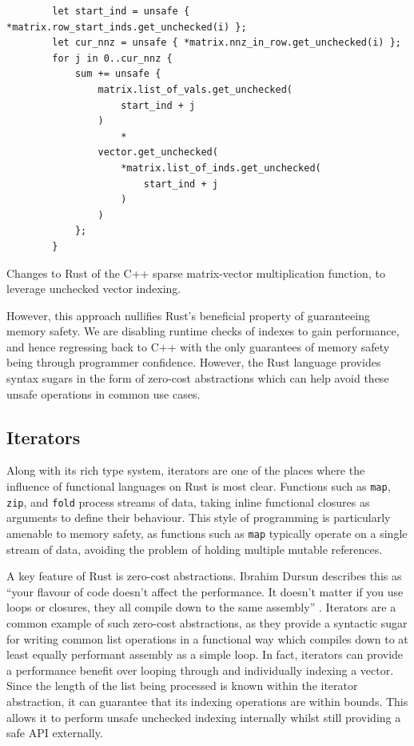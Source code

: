 \begin{listing}[H]
    \begin{verbatim}
        let start_ind = unsafe { *matrix.row_start_inds.get_unchecked(i) };
        let cur_nnz = unsafe { *matrix.nnz_in_row.get_unchecked(i) };
        for j in 0..cur_nnz {
            sum += unsafe {
                matrix.list_of_vals.get_unchecked(
                    start_ind + j
                )
                    *
                vector.get_unchecked(
                    *matrix.list_of_inds.get_unchecked(
                        start_ind + j
                    )
                )
            };
        }
    \end{verbatim}
    \caption{Changes to Rust of the C++ sparse matrix-vector multiplication function, to leverage unchecked vector indexing.}
    \label{listing:rust-sparsemv-unchecked}
\end{listing}

However, this approach nullifies Rust's beneficial property of guaranteeing memory safety. We are disabling runtime checks of indexes to gain performance, and hence regressing back to C++ with the only guarantees of memory safety being through programmer confidence. However, the Rust language provides syntax sugars in the form of zero-cost abstractions which can help avoid these unsafe operations in common use cases.

\subsection{Iterators}
\label{sec:translation-iterators}

Along with its rich type system, iterators are one of the places where the influence of functional languages on Rust is most clear. Functions such as \texttt{map}, \texttt{zip}, and \texttt{fold} process streams of data, taking inline functional closures as arguments to define their behaviour. This style of programming is particularly amenable to memory safety, as functions such as \texttt{map} typically operate on a single stream of data, avoiding the problem of holding multiple mutable references.

A key feature of Rust is zero-cost abstractions. Ibrahim Dursun describes this as ``your flavour of code doesn’t affect the performance. It doesn’t matter if you use loops or closures, they all compile down to the same assembly'' \cite{RustZeroCost2020}. Iterators are a common example of such zero-cost abstractions, as they provide a syntactic sugar for writing common list operations in a functional way which compiles down to at least equally performant assembly as a simple loop. In fact, iterators can provide a performance benefit over looping through and individually indexing a vector. Since the length of the list being processed is known within the iterator abstraction, it can guarantee that its indexing operations are within bounds. This allows it to perform unsafe unchecked indexing internally whilst still providing a safe API externally.

